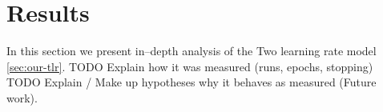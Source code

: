 

\section{Results} 
\label{sec:analysis}
\label{sec:results} 

In this section we present in--depth analysis of the Two learning rate model \ref{sec:our-tlr}.  
TODO Explain how it was measured (runs, epochs, stopping) \\
TODO Explain / Make up hypotheses why it behaves as measured (Future work). \\

 

 

 

 

